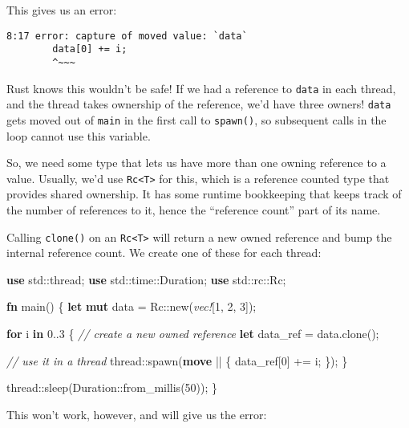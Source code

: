 \documentclass[a4paper,]{book}
\newenvironment{Shaded}{\begin{snugshade}}{\end{snugshade}}
\newcommand{\KeywordTok}[1]{\textcolor[rgb]{0.13,0.29,0.53}{\textbf{{#1}}}}
\newcommand{\DecValTok}[1]{\textcolor[rgb]{0.00,0.00,0.81}{{#1}}}
\newcommand{\CommentTok}[1]{\textcolor[rgb]{0.56,0.35,0.01}{\textit{{#1}}}}
\newcommand{\PreprocessorTok}[1]{\textcolor[rgb]{0.56,0.35,0.01}{\textit{{#1}}}}
\newcommand{\NormalTok}[1]{{#1}}
\begin{document}
This gives us an error:

\begin{verbatim}
8:17 error: capture of moved value: `data`
        data[0] += i;
        ^~~~
\end{verbatim}

Rust knows this wouldn't be safe! If we had a reference to \texttt{data}
in each thread, and the thread takes ownership of the reference, we'd
have three owners! \texttt{data} gets moved out of \texttt{main} in the
first call to \texttt{spawn()}, so subsequent calls in the loop cannot
use this variable.

So, we need some type that lets us have more than one owning reference
to a value. Usually, we'd use \texttt{Rc\textless{}T\textgreater{}} for
this, which is a reference counted type that provides shared ownership.
It has some runtime bookkeeping that keeps track of the number of
references to it, hence the ``reference count'' part of its name.

Calling \texttt{clone()} on an \texttt{Rc\textless{}T\textgreater{}}
will return a new owned reference and bump the internal reference count.
We create one of these for each thread:

\begin{Shaded}
\begin{Highlighting}[]
\KeywordTok{use} \NormalTok{std::thread;}
\KeywordTok{use} \NormalTok{std::time::Duration;}
\KeywordTok{use} \NormalTok{std::rc::Rc;}

\KeywordTok{fn} \NormalTok{main() \{}
    \KeywordTok{let} \KeywordTok{mut} \NormalTok{data = Rc::new(}\PreprocessorTok{vec!}\NormalTok{[}\DecValTok{1}\NormalTok{, }\DecValTok{2}\NormalTok{, }\DecValTok{3}\NormalTok{]);}

    \KeywordTok{for} \NormalTok{i }\KeywordTok{in} \DecValTok{0.}\NormalTok{.}\DecValTok{3} \NormalTok{\{}
        \CommentTok{// create a new owned reference}
        \KeywordTok{let} \NormalTok{data_ref = data.clone();}

        \CommentTok{// use it in a thread}
        \NormalTok{thread::spawn(}\KeywordTok{move} \NormalTok{|| \{}
            \NormalTok{data_ref[}\DecValTok{0}\NormalTok{] += i;}
        \NormalTok{\});}
    \NormalTok{\}}

    \NormalTok{thread::sleep(Duration::from_millis(}\DecValTok{50}\NormalTok{));}
\NormalTok{\}}
\end{Highlighting}
\end{Shaded}

This won't work, however, and will give us the error:
\end{document}

